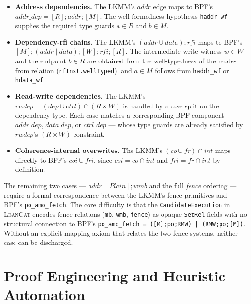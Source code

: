 \begin{itemize}
  \item \textbf{Address dependencies.} The LKMM's $\mathit{addr}$ edge maps to BPF's $\mathit{addr\_dep} = [R];\mathit{addr};[M]$. The well-formedness hypothesis \texttt{haddr\_wf} supplies the required type guards $a \in R$ and $b \in M$.

  \item \textbf{Dependency-rfi chains.} The LKMM's $(\mathit{addr} \cup \mathit{data});\mathit{rfi}$ maps to BPF's $[M];(\mathit{addr} \mid \mathit{data});[W];\mathit{rfi};[R]$. The intermediate write witness $w \in W$ and the endpoint $b \in R$ are obtained from the well-typedness of the reads-from relation (\texttt{rfInst.wellTyped}), and $a \in M$ follows from \texttt{haddr\_wf} or \texttt{hdata\_wf}.

  \item \textbf{Read-write dependencies.} The LKMM's $\mathit{rwdep} = (\mathit{dep} \cup \mathit{ctrl}) \cap (R \times W)$ is handled by a case split on the dependency type. Each case matches a corresponding BPF component --- $\mathit{addr\_dep}$, $\mathit{data\_dep}$, or $\mathit{ctrl\_dep}$ --- whose type guards are already satisfied by $\mathit{rwdep}$'s $(R \times W)$ constraint.

  \item \textbf{Coherence-internal overwrites.} The LKMM's $(\mathit{co} \cup \mathit{fr}) \cap \mathit{int}$ maps directly to BPF's $\mathit{coi} \cup \mathit{fri}$, since $\mathit{coi} = \mathit{co} \cap \mathit{int}$ and $\mathit{fri} = \mathit{fr} \cap \mathit{int}$ by definition.
\end{itemize}

The remaining two cases --- $\mathit{addr};[\mathit{Plain}];\mathit{wmb}$ and the full \textit{fence} ordering --- require a formal correspondence between the LKMM's fence primitives and BPF's \texttt{po\_amo\_fetch}. The core difficulty is that the \texttt{CandidateExecution} in \textsc{LeanCat} encodes fence relations (\texttt{mb}, \texttt{wmb}, \texttt{fence}) as opaque \texttt{SetRel} fields with no structural connection to BPF's \texttt{po\_amo\_fetch = ([M];po;RMW) | (RMW;po;[M])}. Without an explicit mapping axiom that relates the two fence systems, neither case can be discharged. 

\section{Proof Engineering and Heuristic Automation}

